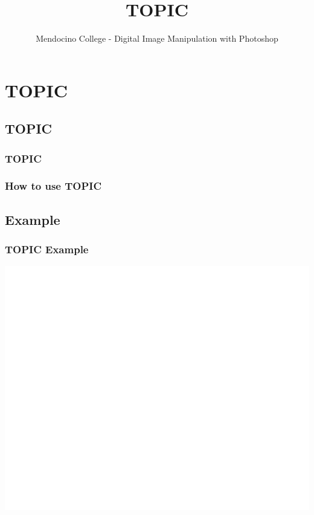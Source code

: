 \documentclass{beamer}
\title{TOPIC}
\author{Mendocino College - Digital Image Manipulation with Photoshop}
\date{\vspace{-5em}}
\begin{document}
	{
		\begin{frame}
			\vspace{-35pt}
			\maketitle
		\end{frame}
	}
		
		
\section{TOPIC}

\subsection{TOPIC}		

	\begin{frame}
		\frametitle{TOPIC}
		\begin{outline}
			\1 
		\end{outline}
	\end{frame}

	\begin{frame}
	\frametitle{How to use TOPIC}
	\begin{outline}
		\1 
	\end{outline}
\end{frame}

\subsection{Example}		
	\begin{frame}
		\frametitle{TOPIC Example}
		\begin{center}
			\includegraphics[width=1.0\textwidth]{images/TOPIC example.png}
		\end{center}
	\end{frame}
\end{document}
